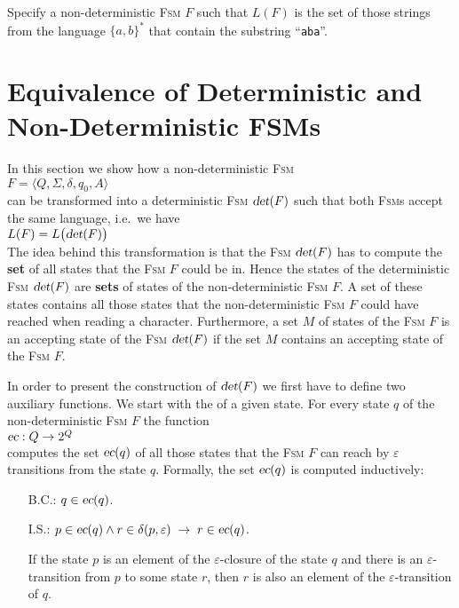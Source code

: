 \exerciseEng
Specify a non-deterministic \textsc{Fsm} $F$ such that $L(F)$ is the set of those
strings from the language  $\{a,b\}^*$ that contain the substring ``\texttt{aba}''. \eox

\section{Equivalence of  Deterministic and Non-Deterministic  FSMs}
In this section we show how a non-deterministic \textsc{Fsm} 
\\[0.2cm]
\hspace*{1.3cm}
$F = \langle Q, \Sigma, \delta, q_0, A \rangle$ 
\\[0.2cm]
can be transformed into a deterministic \textsc{Fsm} $\textsl{det}(F)$ such that both \textsc{Fsm}s accept the
same language, i.e.~we have
\\[0.2cm]
\hspace*{1.3cm}
$L(F) = L\bigl(\textsl{det}(F)\bigr)$
\\[0.2cm]
The idea behind this transformation is that the \textsc{Fsm} $\textsl{det}(F)$ has to compute the \textbf{set} of all states that the
\textsc{Fsm} $F$ could be in.   Hence the states of the deterministic \textsc{Fsm} $\textsl{det}(F)$ are 
\textbf{sets} of states of the non-deterministic \textsc{Fsm} $F$.  A set of these states contains all those 
states that the non-deterministic \textsc{Fsm} $F$ could have reached when reading a character.
Furthermore, a set $M$ of states of the \textsc{Fsm} $F$ is an accepting state of the \textsc{Fsm}
$\textsl{det}(F)$ if the set $M$ contains an accepting state of the \textsc{Fsm} $F$.

In order to present the construction of $\textsl{det}(F)$ we first have to define two auxiliary functions.
We start with the   of a given state.  For every state
$q$ of the non-deterministic \textsc{Fsm} $F$ the function
\\[0.2cm]
\hspace*{1.3cm}
$\textsl{ec}: Q \rightarrow 2^Q$
\\[0.2cm]
computes the set $\textsl{ec}(q)$ of all those states that the \textsc{Fsm} $F$ can reach by $\varepsilon$
transitions from the state $q$.   Formally, the set $\textsl{ec}(q)$ is computed inductively:
\begin{enumerate}
\item[B.C.:] $q \in \textsl{ec}(q)$.
\item[I.S.:] $p \in \textsl{ec}(q) \wedge r \in \delta(p, \varepsilon) \;\rightarrow\; r \in \textsl{ec}(q)$.
 
             If the state $p$ is an element of the $\varepsilon$-closure of the state $q$ and there is an
             $\varepsilon$-transition from $p$ to some state $r$, then $r$ is also an element
             of the $\varepsilon$-transition of $q$. 
\end{enumerate}


